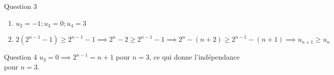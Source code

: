 \documentclass[12pt,french]{beamer}
\begin{document}
\begin{frame}
  \begin{block}{Question 3}
    \begin{enumerate}[label=\alph*)]
      \item $u_2 = -1 ; u_3 = 0 ; u_4 = 3$
      \item $2(2^{n-1} -1) \geqslant 2^{n-1} -1 \implies 2^n -2
        \geqslant 2^{n-1} -1 \implies 2^n - (n+2) \geqslant 2^{n-1} -
        (n+1) \implies u_{n+1} \geqslant u_n$
    \end{enumerate}
  \end{block}
  \begin{block}{Question 4}
    $u_3 = 0 \implies 2^{n-1} = n+1$ pour $n=3$, ce qui donne
    l'indépendance pour $n = 3$.
  \end{block}
\end{frame}
\end{document}
